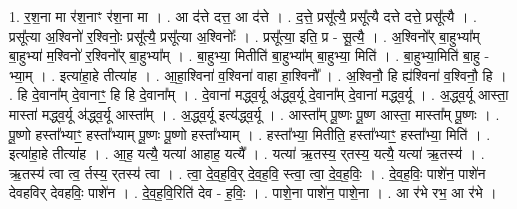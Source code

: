 \documentclass[17pt]{extarticle}
\begin{document}
1. र॒श॒ना मा र॑श॒नाꣳ र॑श॒ना मा । . आ द॑त्ते दत्त॒ आ द॑त्ते । . द॒त्ते॒ प्रसू᳚त्यै॒ प्रसू᳚त्यै दत्ते दत्ते॒ प्रसू᳚त्यै । . प्रसू᳚त्या अ॒श्विनो॑ र॒श्विनोः॒ प्रसू᳚त्यै॒ प्रसू᳚त्या अ॒श्विनोः᳚ । . प्रसू᳚त्या॒ इति॒ प्र - सू॒त्यै॒ । . अ॒श्विनो᳚र् बा॒हुभ्या᳚म् बा॒हुभ्या॑ म॒श्विनो॑ र॒श्विनो᳚र् बा॒हुभ्या᳚म् । . बा॒हुभ्या॒ मितीति॑ बा॒हुभ्या᳚म् बा॒हुभ्या॒ मिति॑ । . बा॒हुभ्या॒मिति॑ बा॒हु - भ्या॒म् । . इत्या॑हा॒हे तीत्या॑ह । . आ॒हा॒श्विना॑ व॒श्विना॑ वाहा हा॒श्विनौ᳚ । . अ॒श्विनौ॒ हि ह्य॑श्विना॑ व॒श्विनौ॒ हि । . हि दे॒वाना᳚म् दे॒वानाꣳ॒॒ हि हि दे॒वाना᳚म् । . दे॒वाना॑ मद्ध्व॒र्यू अ॑द्ध्व॒र्यू दे॒वाना᳚म् दे॒वाना॑ मद्ध्व॒र्यू । . अ॒द्ध्व॒र्यू आस्ता॒ मास्ता॑ मद्ध्व॒र्यू अ॑द्ध्व॒र्यू आस्ता᳚म् । . अ॒द्ध्व॒र्यू इत्य॑द्ध्व॒र्यू । . आस्ता᳚म् पू॒ष्णः पू॒ष्ण आस्ता॒ मास्ता᳚म् पू॒ष्णः । . पू॒ष्णो हस्ता᳚भ्याꣳ॒॒ हस्ता᳚भ्याम् पू॒ष्णः पू॒ष्णो हस्ता᳚भ्याम् । . हस्ता᳚भ्या॒ मितीति॒ हस्ता᳚भ्याꣳ॒॒ हस्ता᳚भ्या॒ मिति॑ । . इत्या॑हा॒हे तीत्या॑ह । . आ॒ह॒ यत्यै॒ यत्या॑ आहाह॒ यत्यै᳚ । . यत्या॑ ऋ॒तस्य॒ र्‌तस्य॒ यत्यै॒ यत्या॑ ऋ॒तस्य॑ । . ऋ॒तस्य॑ त्वा त्व॒ र्तस्य॒ र्‌तस्य॑ त्वा । . त्वा॒ दे॒व॒ह॒वि॒र् दे॒व॒ह॒वि॒ स्त्वा॒ त्वा॒ दे॒व॒ह॒विः॒ । . दे॒व॒ह॒विः॒ पाशे॑न॒ पाशे॑न देवहविर् देवहविः॒ पाशे॑न । . दे॒व॒ह॒वि॒रिति॑ देव - ह॒विः॒ । . पाशे॒ना पाशे॑न॒ पाशे॒ना । . आ र॑भे रभ॒ आ र॑भे । \newline
\end{document}
